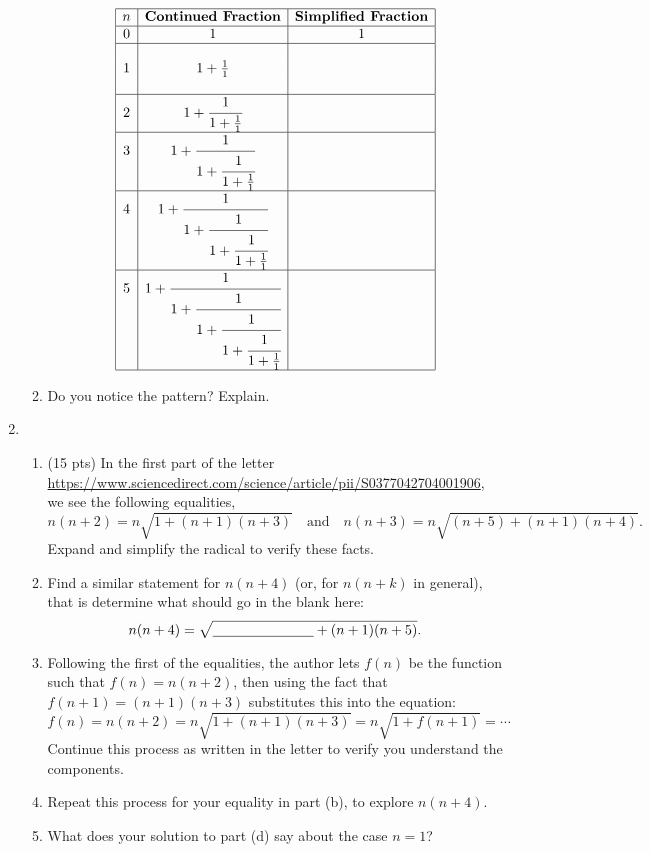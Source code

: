 \documentclass[12pt]{article}
\begin{document}
\begin{enumerate}
\begin{enumerate}
			 	$$\begin{array}{|c|c|c|}
			 	\hline
			 	n&\textbf{Continued Fraction}&\textbf{Simplified Fraction}\\\hline
			 	0 & 1& 1\\\hline&&\\
			 	1 & 1+\frac{1}{1}&\\&&\\\hline
			 	2 & 1+\cfrac{1}{1+\frac{1}{1}}&\\\hline
			 	3 & 1+\cfrac{1}{1+\cfrac{1}{1+\frac{1}{1}}}&\\\hline
			 	4 & 1+\cfrac{1}{1+\cfrac{1}{1+\cfrac{1}{1+\frac{1}{1}}}}&\\\hline
			 	5 & 1+\cfrac{1}{1+\cfrac{1}{1+\cfrac{1}{1+\cfrac{1}{1+\frac{1}{1}}}}}&\\\hline
			 	\end{array}$$
			 \item Do you notice the pattern? Explain. 
		\end{enumerate}
	\newpage
	\item 
	\begin{enumerate}
		\item (15 pts) In the first part of the letter \url{https://www.sciencedirect.com/science/article/pii/S0377042704001906}, we see the following equalities,
			$$
			n(n+2)=n\sqrt{1+(n+1)(n+3)}
			\quad\text{and}\quad
			n(n+3)=n\sqrt{(n+5)+(n+1)(n+4)}.
			$$
		Expand and simplify the radical to verify these facts.
		\vfill
		\item Find a similar statement for $n(n+4)$ (or, for $n(n+k)$ in general), that is determine what should go in the blank here:			$$n(n+4)=\sqrt{\underline{\hspace*{1in}}+(n+1)(n+5)}.$$
		\vfill
		\item Following the first of the equalities, the author lets $f(n)$ be the function such that $f(n)=n(n+2)$, then using the fact that $f(n+1)=(n+1)(n+3)$ substitutes this into the equation:	\[f(n)=n(n+2)=n\sqrt{1+(n+1)(n+3)}=n\sqrt{1+f(n+1)}=\cdots\]
		Continue this process as written in the letter to verify you understand the components.\vfill
		\newpage
		\item Repeat this process for your equality in part (b), to explore $n(n+4)$.\vfill
		\item What does your solution to part (d) say about the case $n=1$?\vskip 1in
	\end{enumerate}
	\end{enumerate}
\end{document}
